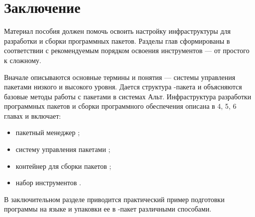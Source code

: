 \chapter*{Заключение}
Материал пособия должен помочь освоить настройку инфраструктуры для разработки и сборки программных пакетов. Разделы глав сформированы в соответствии с рекомендуемым порядком освоения инструментов --- от простого к сложному. 

Вначале описываются основные термины и понятия --- системы управления пакетами низкого и высокого уровня. Дается структура -пакета и объясняются базовые методы работы с пакетами в системах Альт. Инфраструктура разработки программных пакетов и сборки программного обеспечения описана в 4, 5, 6 главах и включает: 
\begin{itemize}
	\item пакетный менеджер ;
	\item систему управления пакетами ;
	\item контейнер для сборки пакетов ;
	\item набор инструментов . 
\end{itemize}

В заключительном разделе приводится практический пример подготовки программы на языке  и упаковки ее в -пакет различными способами. 